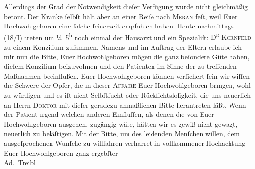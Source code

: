 \begin{ledgroupsized}[t]{13cm}
               Allerdings  der Grad der Notwendigkeit dieſer
               Verfügung wurde nicht gleichmäßig betont. Der Kranke ſelbſt hält aber an einer Reiſe
               nach \textsc{Meran} feſt, weil Euer Hochwohlgeboren eine ſolche ſeinerzeit empfohlen haben.\pend
           \pstart
           Heute{ }nachmittags (18/I) treten um ¼ 5\textsuperscript{h} noch einmal der Hausarzt und ein Spezialiſt: \textsc{D\textsuperscript{r}{ }Kornfeld} zu einem Konzilium zuſammen. Namens und im Auftrag der Eltern erlaube ich mir nun die Bitte, Euer
               Hochwohlgeboren mögen die ganz beſondere Güte haben, {\pb}dieſem Konzilium beizuwohnen und den Patienten im Sinne der zu treffenden Maßnahmen
               beeinflußen.\pend
           \pstart
           Euer Hochwohlgeboren können verſichert ſein wir wiſſen die Schwere der Opfer, die in
               dieser \textsc{Affaire} Euer Hochwohlgeboren bringen, wohl zu
               würdigen und es iſt nicht Selbſtſucht oder Rückſichtsloſigkeit, die uns neuerlich an
               Herrn \textsc{Doktor} mit dieſer geradezu anmaßlichen Bitte
               herantreten läßt. Wenn der Patient irgend welchen anderen Einflüſſen, als denen die von Euer
               Hochwohlgeboren ausgehen, zugängig wäre, hätten wir es gewiß nicht {\pb}gewagt, neuerlich zu beläſtigen.\pend
           \pstart
           Mit der Bitte, um des leidenden Menſchen willen, dem ausgeſprochenen Wunſche zu willfahren verharret in
               vollkommener Hochachtung\pend
           \pstart
           Euer Hochwohlgeboren ganz ergebſter{\\[\baselineskip]}\spacefill\mbox{Ad. Treibl}\pend

\end{ledgroupsized}
